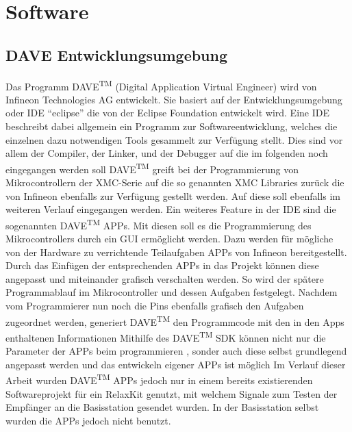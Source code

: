 \chapter{Software}
\label{sec:Software}
\pagestyle{scrheadings}
\section{DAVE Entwicklungsumgebung}

Das Programm DAVE\textsuperscript{TM} (Digital Application Virtual Engineer) wird von Infineon Technologies AG entwickelt. Sie basiert auf der Entwicklungsumgebung oder \ac{IDE} \enquote{eclipse} die von der Eclipse Foundation entwickelt wird. Eine \ac{IDE} beschreibt dabei allgemein ein Programm zur Softwareentwicklung, welches die einzelnen dazu notwendigen Tools gesammelt zur Verfügung stellt. Dies sind vor allem der Compiler, der Linker, und der Debugger auf die im folgenden noch eingegangen werden soll %
DAVE\textsuperscript{TM} greift bei der Programmierung von Mikrocontrollern der XMC-Serie auf die so genannten XMC Libraries zurück die von Infineon ebenfalls zur Verfügung gestellt werden.  Auf diese soll ebenfalls im weiteren Verlauf  eingegangen werden. Ein weiteres Feature in der \ac{IDE} sind die sogenannten DAVE\textsuperscript{TM} APPs. Mit diesen soll es die Programmierung des Mikrocontrollers durch ein \ac{GUI} ermöglicht werden. Dazu werden für  mögliche von der Hardware zu verrichtende Teilaufgaben APPs von Infineon bereitgestellt. Durch das Einfügen der entsprechenden APPs in das Projekt können diese angepasst und miteinander grafisch verschalten werden. So wird der spätere Programmablauf im Mikrocontroller und dessen Aufgaben festgelegt. Nachdem vom Programmierer nun noch die Pins ebenfalls grafisch den Aufgaben zugeordnet werden, generiert  DAVE\textsuperscript{TM}  den Programmcode mit den in den Apps enthaltenen Informationen%
Mithilfe des DAVE\textsuperscript{TM} \ac{SDK} können nicht nur die Parameter der APPs beim programmieren , sonder auch diese selbst grundlegend angepasst werden und das entwickeln eigener APPs ist möglich%
Im Verlauf dieser Arbeit wurden DAVE\textsuperscript{TM}  APPs jedoch nur in einem bereits existierenden Softwareprojekt für ein RelaxKit genutzt, mit welchem  Signale zum Testen der Empfänger an die Basisstation gesendet wurden. In der Basisstation selbst wurden die APPs jedoch nicht benutzt.


